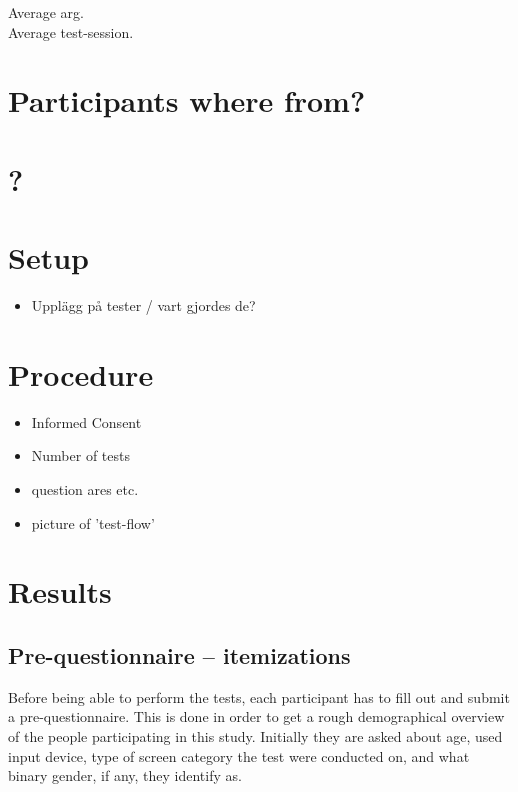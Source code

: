 \documentclass[nofilelist,dvipsnames]{cslthse-msc}
\begin{document}
      Average arg. \\

      Average test-session. \\


      \section{Participants where from?}

      \section{?}

    \section{Setup}

      \begin{itemize}
        \item{Upplägg på tester / vart gjordes de?}
      \end{itemize}

    \section{Procedure}

      \begin{itemize}
        \item{Informed Consent}
        \item{Number of tests}
        \item{question ares etc.}
        \item{picture of 'test-flow'}
      \end{itemize}

		\section{Results}

			\subsection{Pre-questionnaire -- itemizations}

        Before being able to perform the tests, each participant has to fill
        out and submit a pre-questionnaire. This is done in order to get
        a rough demographical overview of the people participating in this
        study. Initially they are asked about age, used input device, type of
        screen category the test were conducted on, and what binary gender, if
        any, they identify as.
\end{document}
